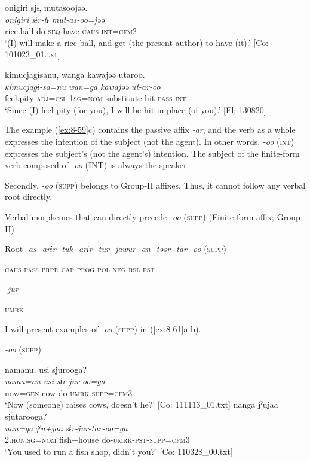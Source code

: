 \ex
{\TM}
\glll  {\textbar}onigiri{\textbar}  sjɨ,  mutasoojəə.\\
\textit{onigiri}  \textit{sɨr-tɨ}  \textit{mut-as-oo=jəə}\\
rice.ball  do-\textsc{seq}  have-\textsc{caus}-\textsc{int}=\textsc{cfm2}\\
\glt ‘(I) will make a rice ball, and get (the present author) to have (it).’ [Co: 101023\_01.txt]

\ex
{\TM}
\glll  kimucjagɨsanu,  wanga  kawajəə  utaroo.\\
\textit{kimucjagɨ-sa=nu}  \textit{wan=ga}  \textit{kawajəə}  \textit{ut-ar-oo}\\
feel.pity-\textsc{adj}=\textsc{csl}  1\textsc{sg}=\textsc{nom}  substitute  hit-\textsc{pass}-\textsc{int}\\
\glt ‘Since (I) feel pity (for you), I will be hit in place (of you).’ [El: 130820]

The example (\ref{ex:8-59}c) contains the passive affix \textit{-ar}, and the verb as a whole expresses the intention of the subject (not the agent). In other words, \textit{-oo} (\textsc{int}) expresses the subject’s (not the agent’s) intention. The subject of the finite-form verb composed of \textit{-oo} (INT) is always the speaker.

  Secondly, \textit{-oo} (\textsc{supp}) belongs to Group-II affixes. Thus, it cannot follow any verbal root directly.

\ea\label{ex:8-60}
  Verbal morphemes that can directly precede \textit{-oo} (\textsc{supp}) (Finite-form affix; Group II)

  Root  \textit{-as  -arɨr} %
\textit{-tuk  -arɨr  -tur  -jawur} %
\textit{-an  -təər  -tar  -oo} (\textsc{supp})

    \textsc{caus}  \textsc{pass}  \textsc{prpr}  \textsc{cap}  \textsc{prog}  \textsc{pol}  \textsc{neg}  \textsc{rsl}  \textsc{pst}

          \textit{-jur}

          \textsc{umrk}
\z

I will present examples of \textit{-oo} (\textsc{supp}) in (\ref{ex:8-61}a-b).

\ea\label{ex:8-61}
  \textit{-oo} (\textsc{supp})

\ea
{\TM}
\glll  namanu,  usi  sjurooga?\\
\textit{nama=nu}  \textit{usi}  \textit{sɨr-jur-oo=ga}\\
now=\textsc{gen}  cow  do-\textsc{umrk}-\textsc{supp}=\textsc{cfm3}\\
\glt ‘Now (someone) raises cows, doesn’t he?’ [Co: 111113\_01.txt]
\ex
{\TM}
\glll  nanga  jˀujaa  sjutarooga?\\
\textit{nan=ga}  \textit{jˀu+jaa}  \textit{sɨr-jur-tar-oo=ga}\\
2.\textsc{hon}.\textsc{sg}=\textsc{nom}  fish+house  do-\textsc{umrk}-\textsc{pst}-\textsc{supp}=\textsc{cfm3}\\
\glt ‘You used to run a fish shop, didn’t you?’ [Co: 110328\_00.txt]
\z
\z

